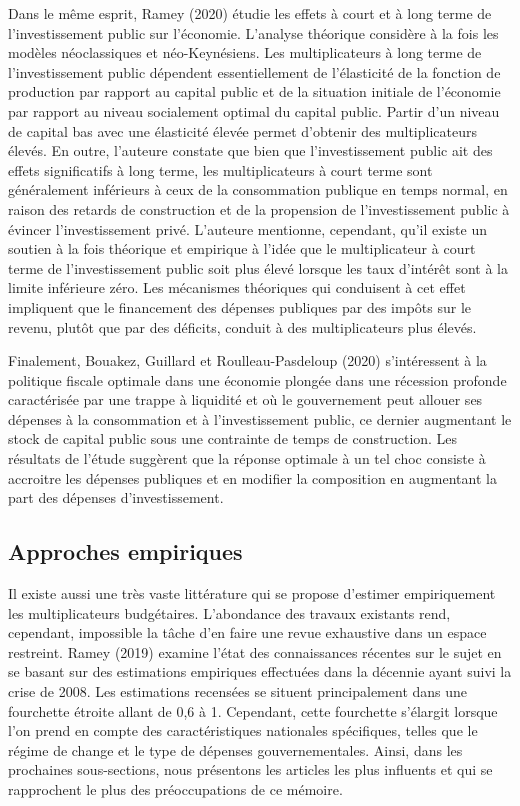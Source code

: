 \documentclass[12pt,letterpaper]{article}
\begin{document}
Dans le même esprit, Ramey (2020) étudie les effets à court et à long terme de l'investissement public sur l'économie. L'analyse théorique considère à la fois les modèles néoclassiques et néo-Keynésiens. Les multiplicateurs à long terme de l'investissement public dépendent essentiellement de l'élasticité de la fonction de production par rapport au capital public et de la situation initiale de l'économie par rapport au niveau socialement optimal du capital public. Partir d’un niveau de capital bas avec une élasticité élevée permet d’obtenir des multiplicateurs élevés. En outre, l’auteure constate que bien que l'investissement public ait des effets significatifs à long terme, les multiplicateurs à court terme sont généralement inférieurs à ceux de la consommation publique en temps normal, en raison des retards de construction et de la propension de l'investissement public à évincer l’investissement privé. L’auteure mentionne, cependant, qu'il existe un soutien à la fois théorique et empirique à l’idée que le multiplicateur à court terme de l'investissement public soit plus élevé lorsque les taux d'intérêt sont à la limite inférieure zéro. Les mécanismes théoriques qui conduisent à cet effet impliquent que le financement des dépenses publiques par des impôts sur le revenu, plutôt que par des déficits, conduit à des multiplicateurs plus élevés.

Finalement, Bouakez, Guillard et Roulleau-Pasdeloup (2020) s’intéressent à la politique fiscale optimale dans une économie plongée dans une récession profonde caractérisée par une trappe à liquidité et où le gouvernement peut allouer ses dépenses à la consommation et à l'investissement public, ce dernier augmentant le stock de capital public sous une contrainte de temps de construction. Les résultats de l'étude suggèrent que la réponse optimale à un tel choc consiste à accroitre les dépenses publiques et en modifier la composition en augmentant la part des dépenses d’investissement.

\subsection{Approches empiriques}

Il existe aussi une très vaste littérature qui se propose d’estimer empiriquement les multiplicateurs budgétaires. L’abondance des travaux existants rend, cependant, impossible la tâche d’en faire une revue exhaustive dans un espace restreint. Ramey (2019) examine l'état des connaissances récentes sur le sujet en se basant sur des estimations empiriques effectuées dans la décennie ayant suivi la crise de 2008. Les estimations recensées se situent principalement dans une fourchette étroite allant de 0,6 à 1. Cependant, cette fourchette s'élargit lorsque l'on prend en compte des caractéristiques nationales spécifiques, telles que le régime de change et le type de dépenses gouvernementales. Ainsi, dans les prochaines sous-sections, nous présentons les articles les plus influents et qui se rapprochent le plus des préoccupations de ce mémoire.
\end{document}
